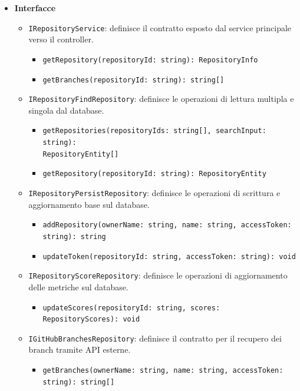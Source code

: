 \documentclass[a4paper, 11pt]{article}
\begin{document}
\begin{itemize}
  \item \textbf{Interfacce}
    \begin{itemize}
      \item \texttt{IRepositoryService}: definisce il contratto esposto dal service principale verso il controller.
        \begin{itemize}
          \item \texttt{getRepository(repositoryId: string): RepositoryInfo} 
          
          \item \texttt{getBranches(repositoryId: string): string[]} 
        \end{itemize}

      \item \texttt{IRepositoryFindRepository}: definisce le operazioni di lettura multipla e singola dal database.
        \begin{itemize}
          \item \texttt{getRepositories(repositoryIds: string[], searchInput: string): \\ RepositoryEntity[]} 

          \item \texttt{getRepository(repositoryId: string): RepositoryEntity} 
        \end{itemize}

      \item \texttt{IRepositoryPersistRepository}: definisce le operazioni di scrittura e aggiornamento base sul database.
        \begin{itemize}
          \item \texttt{addRepository(ownerName: string, name: string, accessToken: string): string} 

          \item \texttt{updateToken(repositoryId: string, accessToken: string): void} 
        \end{itemize}

      \item \texttt{IRepositoryScoreRepository}: definisce le operazioni di aggiornamento delle metriche sul database.
        \begin{itemize}
          \item \texttt{updateScores(repositoryId: string, scores: RepositoryScores): void} 
        \end{itemize}

      \item \texttt{IGitHubBranchesRepository}: definisce il contratto per il recupero dei branch tramite API esterne.
        \begin{itemize}
          \item \texttt{getBranches(ownerName: string, name: string, accessToken: string): string[]} 
        \end{itemize}


\end{itemize}
\end{itemize}
\end{document}
